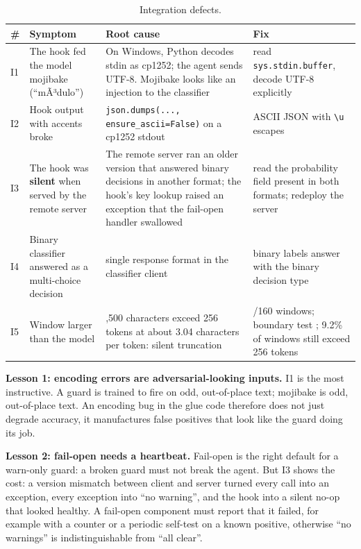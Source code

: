 \documentclass[11pt]{article}
\newcommand{\code}[1]{\texttt{#1}}
\begin{document}
\begin{table}[tbp]
\centering
\small
\caption{Integration defects.}\label{tab:12}
\begin{tabularx}{\linewidth}{@{}l>{\raggedright\arraybackslash\hsize=0.59\hsize}X>{\raggedright\arraybackslash\hsize=1.55\hsize}X>{\raggedright\arraybackslash\hsize=0.87\hsize}X@{}}
\toprule
\# & Symptom & Root cause & Fix \\
\midrule
I1 & The hook fed the model mojibake (``mÃ³dulo'') & On Windows, Python decodes stdin as cp1252; the agent sends UTF-8. Mojibake looks like an injection to the classifier & read \code{sys.\allowbreak{}stdin.\allowbreak{}buffer}, decode UTF-8 explicitly %
 \\
I2 & Hook output with accents broke & \code{json.\allowbreak{}dumps(.\allowbreak{}.\allowbreak{}.\allowbreak{}, ensure\_\allowbreak{}ascii=False)} on a cp1252 stdout & ASCII JSON with \code{\textbackslash{}u} escapes %
 \\
I3 & The hook was \textbf{silent} when served by the remote server & The remote server ran an older version that answered binary decisions in another format; the hook's key lookup raised an exception that the fail-open handler swallowed & read the probability field present in both formats; redeploy the server %
 \\
I4 & Binary classifier answered as a multi-choice decision & single response format in the classifier client & binary labels answer with the binary decision type %
 \\
I5 & Window larger than the model & 1,500 characters exceed 256 tokens at about 3.04 characters per token: silent truncation & 640/160 windows; boundary test%
; 9.2\% of windows still exceed 256 tokens %
 \\
\bottomrule
\end{tabularx}
\end{table}

\textbf{Lesson 1: encoding errors are adversarial-looking inputs.} I1 is the most instructive. A guard is trained to fire on odd, out-of-place text; mojibake is odd, out-of-place text. An encoding bug in the glue code therefore does not just degrade accuracy, it manufactures false positives that look like the guard doing its job.

\textbf{Lesson 2: fail-open needs a heartbeat.} Fail-open is the right default for a warn-only guard: a broken guard must not break the agent. But I3 shows the cost: a version mismatch between client and server turned every call into an exception, every exception into ``no warning'', and the hook into a silent no-op that looked healthy. A fail-open component must report that it failed, for example with a counter or a periodic self-test on a known positive, otherwise ``no warnings'' is indistinguishable from ``all clear''.
\end{document}
